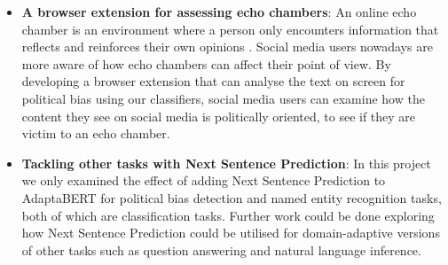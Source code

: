 \begin{itemize}
    \item \textbf{A browser extension for assessing echo chambers}: An online echo chamber is an environment where a person only encounters information that reflects and reinforces their own opinions \cite{echo-chambers}. Social media users nowadays are more aware of how echo chambers can affect their point of view. By developing a browser extension that can analyse the text on screen for political bias using our classifiers, social media users can examine how the content they see on social media is politically oriented, to see if they are victim to an echo chamber.
    \item \textbf{Tackling other tasks with Next Sentence Prediction}: In this project we only examined the effect of adding Next Sentence Prediction to AdaptaBERT for political bias detection and named entity recognition tasks, both of which are classification tasks. Further work could be done exploring how Next Sentence Prediction could be utilised for domain-adaptive versions of other tasks such as question answering and natural language inference.
\end{itemize}





